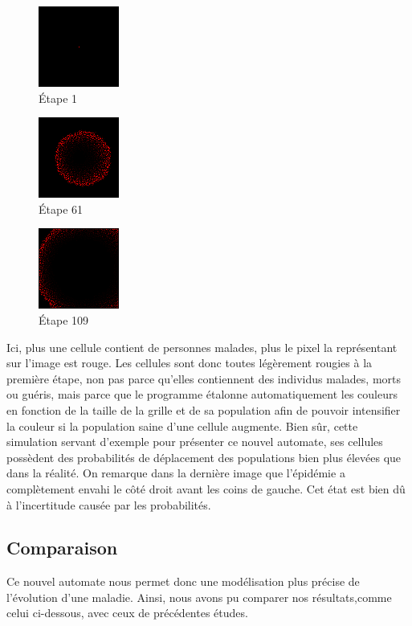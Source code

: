 \documentclass{article}
\begin{document}
\begin{figure}[H]
\caption{Étape 1}
\centering
\includegraphics[scale=2]{../images/Frame-1-maldes-contr.png}
\end{figure}

\begin{figure}[H]
\caption{Étape 61}
\centering
\includegraphics[scale=2]{../images/Frame-61-malades-contr.png}
\end{figure}

\begin{figure}[H]
\caption{Étape 109}
\centering
\includegraphics[scale=2]{../images/Frame-109_malades-contr.png}
\end{figure}


Ici, plus une cellule contient de personnes malades, plus le pixel la représentant sur l'image est rouge. Les cellules sont donc toutes légèrement rougies à la première étape, non pas parce qu'elles contiennent des individus malades, morts ou guéris, mais parce que le programme étalonne automatiquement les couleurs en fonction de la taille de la grille et de sa population afin de pouvoir intensifier la couleur si la population saine d'une cellule augmente.
Bien sûr, cette simulation servant d'exemple pour présenter ce nouvel automate, ses cellules possèdent des probabilités de déplacement des populations bien plus élevées que dans la réalité.
On remarque dans la dernière image que l'épidémie a complètement envahi le côté droit avant les coins de gauche. Cet état est bien dû à l'incertitude causée par les probabilités.

 \subsection{Comparaison}
Ce nouvel automate nous permet donc une modélisation plus précise de l'évolution d'une maladie. Ainsi, nous avons pu comparer nos résultats,comme celui ci-dessous, avec ceux de précédentes études.
\end{document}
